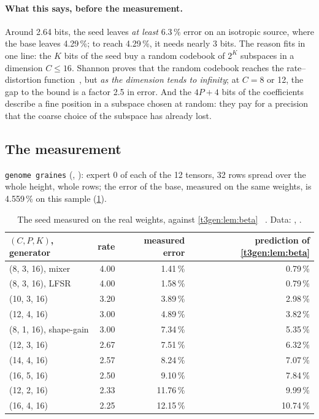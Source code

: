 \paragraph{What this says, before the measurement.} Around 2.64 bits, the seed leaves \emph{at least} 6.3\,\% error on an isotropic source, where the base leaves 4.29\,\%; to reach 4.29\,\%, it needs nearly 3 bits. The reason fits in one line: the $K$ bits of the seed buy a random codebook of $2^K$ subspaces in a dimension $C \le 16$. Shannon proves that the random codebook reaches the rate--distortion function~\cite{shannon1959}, but \emph{as the dimension tends to infinity}; at $C = 8$ or 12, the gap to the bound is a factor 2.5 in error. And the $4P + 4$ bits of the coefficients describe a fine position in a subspace chosen at random: they pay for a precision that the coarse choice of the subspace has already lost.

\subsection{The measurement}

\texttt{genome graines} (, ): expert 0 of each of the 12 tensors, 32 rows spread over the whole height, whole rows; the error of the base, measured on the same weights, is 4.559\,\% on this sample (\cref{t3gen:tab:graine}).

\begin{table}[tbp]
\centering\small
\begin{tabular}{l r r r}
\toprule
$(C, P, K)$, generator & rate & measured error & prediction of \cref{t3gen:lem:beta} \\
\midrule
(8, 3, 16), mixer & 4.00 & 1.41\,\% & 0.79\,\% \\
(8, 3, 16), LFSR & 4.00 & 1.58\,\% & 0.79\,\% \\
(10, 3, 16) & 3.20 & 3.89\,\% & 2.98\,\% \\
(12, 4, 16) & 3.00 & 4.89\,\% & 3.82\,\% \\
(8, 1, 16), shape-gain & 3.00 & 7.34\,\% & 5.35\,\% \\
(12, 3, 16) & 2.67 & 7.51\,\% & 6.32\,\% \\
(14, 4, 16) & 2.57 & 8.24\,\% & 7.07\,\% \\
(16, 5, 16) & 2.50 & 9.10\,\% & 7.84\,\% \\
(12, 2, 16) & 2.33 & 11.76\,\% & 9.99\,\% \\
(16, 4, 16) & 2.25 & 12.15\,\% & 10.74\,\% \\
\bottomrule
\end{tabular}
\caption[The seed measured against theory]{The seed measured on the real weights, against \cref{t3gen:lem:beta} \mes~\calc. Data: , .}
\label{t3gen:tab:graine}
\end{table}

